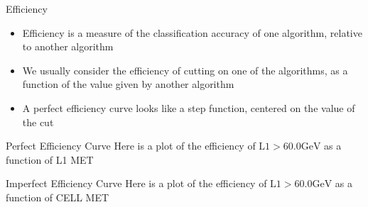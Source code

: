 \documentclass[]{beamer}
\begin{document}
\begin{frame}{Efficiency}
		\begin{itemize}
				\item Efficiency is a measure of the classification accuracy of one algorithm, relative to another algorithm
				\item We usually consider the efficiency of cutting on one of the algorithms, as a function of the value given by another algorithm
				\item A perfect efficiency curve looks like a step function, centered on the value of the cut
		\end{itemize}
\end{frame}
\begin{frame}{Perfect Efficiency Curve}
        Here is a plot of the efficiency of $\textrm{L1} > 60.0 \textrm{GeV}$ as a function of L1 MET\\
\end{frame}
\begin{frame}{Imperfect Efficiency Curve}
        Here is a plot of the efficiency of $\textrm{L1} > 60.0 \textrm{GeV}$ as a function of CELL MET\\
\end{frame}
\end{document}
